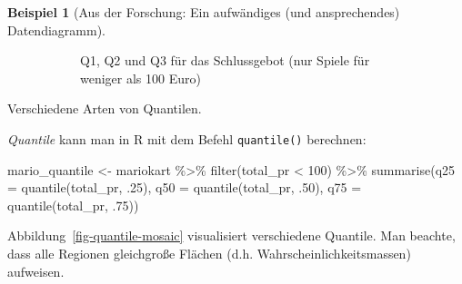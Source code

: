 \documentclass[
  a4paper,
]{scrbook}
\newenvironment{Shaded}{\begin{snugshade}}{\end{snugshade}}
\newcommand{\AttributeTok}[1]{\textcolor[rgb]{0.40,0.45,0.13}{#1}}
\newcommand{\DecValTok}[1]{\textcolor[rgb]{0.68,0.00,0.00}{#1}}
\newcommand{\FunctionTok}[1]{\textcolor[rgb]{0.28,0.35,0.67}{#1}}
\newcommand{\NormalTok}[1]{\textcolor[rgb]{0.00,0.23,0.31}{#1}}
\newcommand{\OtherTok}[1]{\textcolor[rgb]{0.00,0.23,0.31}{#1}}
\newcommand{\SpecialCharTok}[1]{\textcolor[rgb]{0.37,0.37,0.37}{#1}}
\theoremstyle{definition}
\newtheorem{example}{Beispiel}[chapter]
\theoremstyle{definition}
\theoremstyle{definition}
\theoremstyle{remark}
\begin{document}
\begin{example}[Aus der Forschung: Ein aufwändiges (und ansprechendes)
Datendiagramm]
\begin{figure}
{\begin{figure}[H]
\begin{minipage}{0.50\linewidth}

\end{minipage}%

\caption{\label{fig-mario-qs1}Q1, Q2 und Q3 für das Schlussgebot (nur
Spiele für weniger als 100 Euro)}

\end{figure}%

}

\caption{\label{fig-quantile-mario}}

\end{figure}%

Verschiedene Arten von Quantilen.

\end{example}

\emph{Quantile} kann man in R mit dem Befehl \texttt{quantile()}
berechnen:

\begin{Shaded}
\begin{Highlighting}[]
\NormalTok{mario\_quantile }\OtherTok{\textless{}{-}} 
\NormalTok{mariokart }\SpecialCharTok{\%\textgreater{}\%} 
  \FunctionTok{filter}\NormalTok{(total\_pr }\SpecialCharTok{\textless{}} \DecValTok{100}\NormalTok{) }\SpecialCharTok{\%\textgreater{}\%} 
  \FunctionTok{summarise}\NormalTok{(}\AttributeTok{q25 =} \FunctionTok{quantile}\NormalTok{(total\_pr, .}\DecValTok{25}\NormalTok{),}
            \AttributeTok{q50 =} \FunctionTok{quantile}\NormalTok{(total\_pr, .}\DecValTok{50}\NormalTok{),}
            \AttributeTok{q75 =} \FunctionTok{quantile}\NormalTok{(total\_pr, .}\DecValTok{75}\NormalTok{))}
\end{Highlighting}
\end{Shaded}

Abbildung~\ref{fig-quantile-mosaic} visualisiert verschiedene Quantile.
Man beachte, dass alle Regionen gleichgroße Flächen (d.h.
Wahrscheinlichkeitsmassen) aufweisen.
\end{document}
